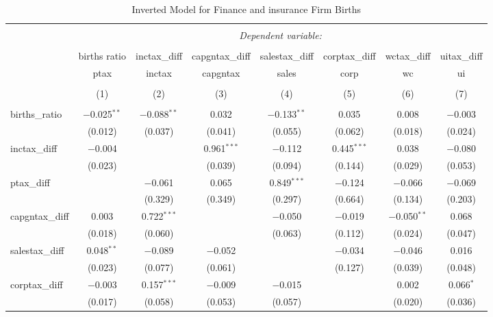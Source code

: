 
\begin{table}[!htbp] \centering 
  \caption{Inverted Model for  Finance and insurance Firm Births} 
  \label{52rd} 
\footnotesize 
\begin{tabular}{@{\extracolsep{5pt}}lccccccc} 
\\[-1.8ex]\hline 
\hline \\[-1.8ex] 
 & \multicolumn{7}{c}{\textit{Dependent variable:}} \\ 
\cline{2-8} 
\\[-1.8ex] & births ratio & inctax\_diff & capgntax\_diff & salestax\_diff & corptax\_diff & wctax\_diff & uitax\_diff \\ 
 & ptax & inctax & capgntax & sales & corp & wc & ui \\ 
\\[-1.8ex] & (1) & (2) & (3) & (4) & (5) & (6) & (7)\\ 
\hline \\[-1.8ex] 
 births\_ratio & $-$0.025$^{**}$ & $-$0.088$^{**}$ & 0.032 & $-$0.133$^{**}$ & 0.035 & 0.008 & $-$0.003 \\ 
  & (0.012) & (0.037) & (0.041) & (0.055) & (0.062) & (0.018) & (0.024) \\ 
  inctax\_diff & $-$0.004 &  & 0.961$^{***}$ & $-$0.112 & 0.445$^{***}$ & 0.038 & $-$0.080 \\ 
  & (0.023) &  & (0.039) & (0.094) & (0.144) & (0.029) & (0.053) \\ 
  ptax\_diff &  & $-$0.061 & 0.065 & 0.849$^{***}$ & $-$0.124 & $-$0.066 & $-$0.069 \\ 
  &  & (0.329) & (0.349) & (0.297) & (0.664) & (0.134) & (0.203) \\ 
  capgntax\_diff & 0.003 & 0.722$^{***}$ &  & $-$0.050 & $-$0.019 & $-$0.050$^{**}$ & 0.068 \\ 
  & (0.018) & (0.060) &  & (0.063) & (0.112) & (0.024) & (0.047) \\ 
  salestax\_diff & 0.048$^{**}$ & $-$0.089 & $-$0.052 &  & $-$0.034 & $-$0.046 & 0.016 \\ 
  & (0.023) & (0.077) & (0.061) &  & (0.127) & (0.039) & (0.048) \\ 
  corptax\_diff & $-$0.003 & 0.157$^{***}$ & $-$0.009 & $-$0.015 &  & 0.002 & 0.066$^{*}$ \\ 
  & (0.017) & (0.058) & (0.053) & (0.057) &  & (0.020) & (0.036) \\ 

\end{tabular}
\end{table}
